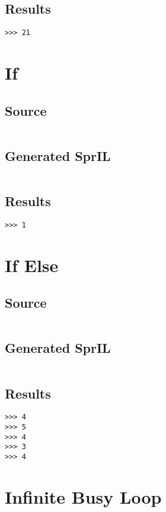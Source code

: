 \documentclass[twoside]{report}
\begin{document}
\subsection{Results}
\begin{verbatim}
>>> 21
\end{verbatim}

\section{If}
\subsection{Source}
\inputminted[tabsize=4,linenos,firstnumber=1]{text}{../test/if.shl}
\subsection{Generated SprIL}
\inputminted[tabsize=4,linenos,firstnumber=0]{text}{../test/if_gen.txt}
\subsection{Results}
\begin{verbatim}
>>> 1
\end{verbatim}

\section{If Else}
\subsection{Source}
\inputminted[tabsize=4,linenos,firstnumber=1]{text}{../test/ifelse.shl}
\subsection{Generated SprIL}
\inputminted[tabsize=4,linenos,firstnumber=0]{text}{../test/ifelse_gen.txt}
\subsection{Results}
\begin{verbatim}
>>> 4
>>> 5
>>> 4
>>> 3
>>> 4
\end{verbatim}

\section{Infinite Busy Loop}
\end{document}

